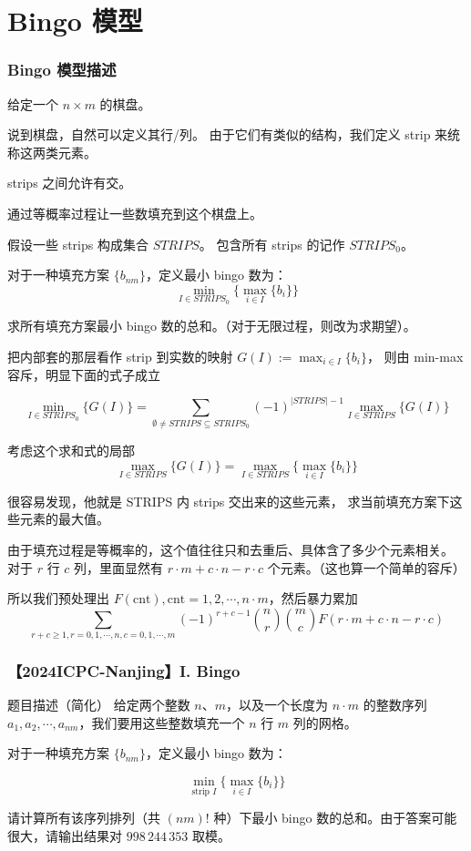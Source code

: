 \section{Bingo 模型}

\begin{frame}
  \frametitle{Bingo 模型描述}

  给定一个 $n\times m$ 的棋盘。
  
  说到棋盘，自然可以定义其行/列。
  由于它们有类似的结构，我们定义 strip 来统称这两类元素。
  
  strips 之间允许有交。

  通过等概率过程让一些数填充到这个棋盘上。

  假设一些 strips 构成集合 $STRIPS$。
  包含所有 strips 的记作 $STRIPS_0$。

  对于一种填充方案 $\{b_{nm}\}$，定义最小 bingo 数为：
  $$
  \min_{I\in STRIPS_0}\{\max_{i \in I}\{ b_i\}\}
  $$

  求所有填充方案最小 bingo 数的总和。（对于无限过程，则改为求期望）。
  
  把内部套的那层看作 strip 到实数的映射 $G(I):=\max_{i \in I}\{ b_i\}$， 则由 min-max 容斥，明显下面的式子成立

\end{frame}

\begin{frame}

  $$
  \min_{I\in STRIPS_0}\{G(I)\} = 
  \sum_{
    \emptyset\not= STRIPS \subseteq STRIPS_0  
  }
  (-1)^{|STRIPS|-1}
  \max_{I\in STRIPS}\{G(I)\}
  $$  

  考虑这个求和式的局部
  $$
  \max_{I\in STRIPS}\{G(I)\} = \max_{I\in STRIPS}\{\max_{i \in I}\{ b_i\}\}
  $$

  很容易发现，他就是 STRIPS 内 strips 交出来的这些元素，
  求当前填充方案下这些元素的最大值。
  
  由于填充过程是等概率的，这个值往往只和去重后、具体含了多少个元素相关。
  对于 $r$ 行 $c$ 列，里面显然有 $r\cdot m + c\cdot n - r\cdot c$ 个元素。（这也算一个简单的容斥）
  
  所以我们预处理出 $F(\text{cnt}), \text{cnt} = 1,2,\cdots, n\cdot m$，然后暴力累加
  $$
  \sum_{r+c\ge 1, r=0,1,\cdots,n, c = 0,1,\cdots, m}
  (-1)^{r+c-1}\binom{n}{r}\binom{m}{c} F(r\cdot m + c\cdot n - r\cdot c)
  $$

\end{frame}

\begin{frame}
  \frametitle{【2024ICPC-Nanjing】I. Bingo}

  \begin{block}{题目描述（简化）}
  给定两个整数 $n$、$m$，以及一个长度为 $n\cdot m$ 的整数序列 $a_1, a_2, \cdots, a_{nm}$，我们要用这些整数填充一个 $n$ 行 $m$ 列的网格。

  对于一种填充方案 $\{b_{nm}\}$，定义最小 bingo 数为：

  $$
  \min_{\text{strip }I}\{\max_{i \in I}\{ b_i\}\}
  $$

  请计算所有该序列排列（共 $(nm)!$ 种）下最小 bingo 数的总和。由于答案可能很大，请输出结果对 $998\,244\,353$ 取模。
  \end{block}

\end{frame}

